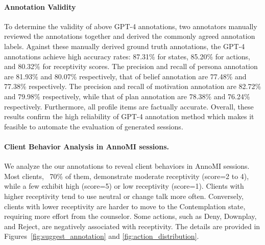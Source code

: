 \paragraph{Annotation Validity} To determine the validity of above GPT-4 annotations, two annotators manually reviewed the annotations together and derived the commonly agreed annotation labels.  Against these manually derived ground truth annotations, the GPT-4 annotations achieve high accuracy rates: 87.31\% for states, 85.20\% for actions, and 80.32\% for receptivity scores. The precision and recall of persona annotation are 81.93\% and 80.07\% respectively, that of belief annotation are 77.48\% and 77.38\% respectively. The precision and recall of motivation annotation are 82.72\% and 79.98\% respectively, while that of plan annotation are 78.38\% and 76.24\% respectively. Furthermore, all profile items are factually accurate. Overall, these results confirm the high reliability of GPT-4 annotation method which makes it feasible to automate the evaluation of generated sessions. 

\paragraph{Client Behavior Analysis in AnnoMI sessions.} We analyze the our annotations to reveal client behaviors in AnnoMI sessions. Most clients, ~70\% of them, demonstrate moderate receptivity (score=2 to 4), while a few exhibit high (score=5) or low receptivity (score=1). Clients with higher receptivity tend to use neutral or change talk more often. Conversely, clients with lower receptivity are harder to move to the Contemplation state, requiring more effort from the counselor. Some actions, such as Deny, Downplay, and Reject, are negatively associated with receptivity. The details are provided in Figures~\ref{fig:suggest_annotation} and \ref{fig:action_distribution}.

